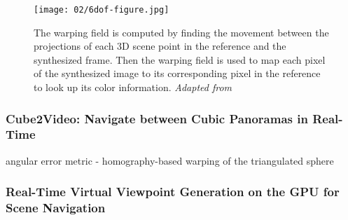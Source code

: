 \begin{figure}[]
\centering
\texttt{[image: 02/6dof-figure.jpg]}
\caption[Image warping from Huang et al.]{The warping field is computed by finding the movement between the projections of each 3D scene point in the reference and the synthesized frame. Then the warping field is used to map each pixel of the synthesized image to its corresponding pixel in the reference to look up its color information. \emph{Adapted from \cite{6dof}}}
\label{fig:6dof-figure}
\end{figure}

\subsubsection{Cube2Video: Navigate between Cubic Panoramas in Real-Time}
 \cite{cube2video}
angular error metric
- homography-based warping of the triangulated sphere

\subsubsection{Real-Time Virtual Viewpoint Generation on the GPU for Scene Navigation}
\cite{360flowblending}
